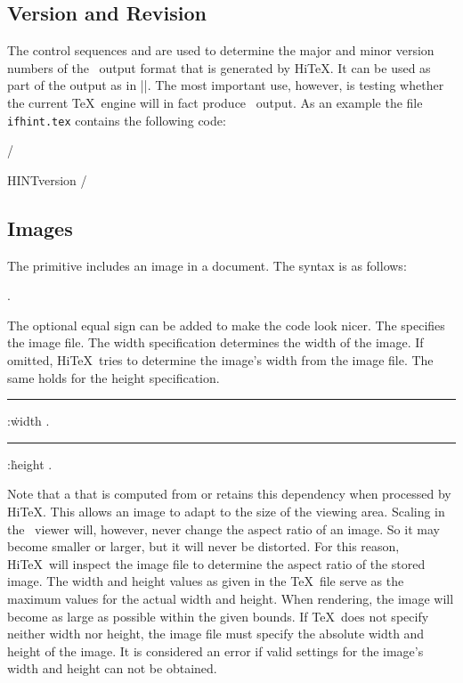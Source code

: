 \subsection{Version and Revision}
The control sequences 
and  are
used to determine the major and minor version numbers of the \HINT\ output format
that is generated by Hi\TeX. It can be used as part of the output as 
in \verbatim|\the\HINTversion|.
The most important use, however, is testing whether the current \TeX\ engine
will in fact produce \HINT\ output.
As an example the file {\tt ifhint.tex}
contains the following code:


\verbatim/
\newif\ifhint
\expandafter
  \ifx\csname HINTversion\endcsname\relax
  \hintfalse\else\hinttrue\fi/


\subsection{Images}
The primitive 
includes an image in a document.
The syntax is as follows:

\medskip
\prim{}  \opt{\.{=}} 
 . 
\medskip

The optional equal sign can be added to make the code look nicer.
The  specifies the image file.
The width specification determines the width of the image. If omitted,
Hi\TeX\ tries to determine the image's width from the image file.
The same holds for the height specification.

\medskip
\rule {}:\.{width} .
\rule {}:\.{height} .
\medskip

Note that a  that is computed from 
or  retains this dependency when processed by Hi\TeX.
This allows an image to adapt to the size of the viewing area.
Scaling in the \HINT\ viewer will, however, never change the
aspect ratio of an image. So it may become smaller or larger,
but it will never be distorted.
For this reason, Hi\TeX\ will inspect the image file to determine the
aspect ratio of the stored image.
The width and height values as given in the \TeX\ file serve
as the maximum values for the actual width and height. When rendering,
the image will become as large as possible within the given bounds.
If \TeX\ does not specify neither width nor height, the image file
must specify the absolute width and height of the image.
It is considered an error if valid settings for the image's width and height
can not be obtained.

